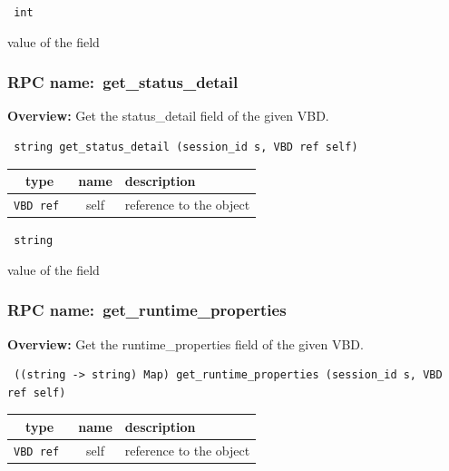 \vspace{0.3cm}

{\tt 
int
}


value of the field
\vspace{0.3cm}
\vspace{0.3cm}
\vspace{0.3cm}
\subsubsection{RPC name:~get\_status\_detail}

{\bf Overview:} 
Get the status\_detail field of the given VBD.

\begin{verbatim} string get_status_detail (session_id s, VBD ref self)\end{verbatim}



 
\vspace{0.3cm}
\begin{tabular}{|c|c|p{7cm}|}
 \hline
{\bf type} & {\bf name} & {\bf description} \\ \hline
{\tt VBD ref } & self & reference to the object \\ \hline 

\end{tabular}

\vspace{0.3cm}

{\tt 
string
}


value of the field
\vspace{0.3cm}
\vspace{0.3cm}
\vspace{0.3cm}
\subsubsection{RPC name:~get\_runtime\_properties}

{\bf Overview:} 
Get the runtime\_properties field of the given VBD.

\begin{verbatim} ((string -> string) Map) get_runtime_properties (session_id s, VBD ref self)\end{verbatim}



 
\vspace{0.3cm}
\begin{tabular}{|c|c|p{7cm}|}
 \hline
{\bf type} & {\bf name} & {\bf description} \\ \hline
{\tt VBD ref } & self & reference to the object \\ \hline 

\end{tabular}

